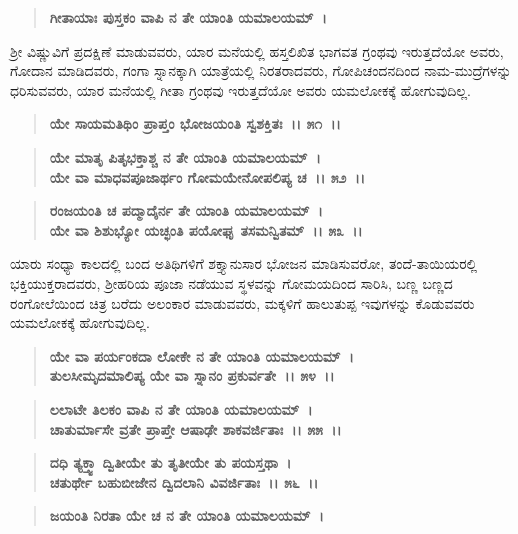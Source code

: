 \begin{verse}
\textbf{ಗೀತಾಯಾಃ ಪುಸ್ತಕಂ ವಾಪಿ ನ ತೇ ಯಾಂತಿ ಯಮಾಲಯಮ್~।}
\end{verse}

ಶ‍್ರೀ ವಿಷ್ಣುವಿಗೆ ಪ್ರದಕ್ಷಿಣೆ ಮಾಡುವವರು, ಯಾರ ಮನೆಯಲ್ಲಿ ಹಸ್ತಲಿಖಿತ ಭಾಗವತ ಗ್ರಂಥವು ಇರುತ್ತದೆಯೋ ಅವರು, ಗೋದಾನ ಮಾಡಿದವರು, ಗಂಗಾ ಸ್ನಾನಕ್ಕಾಗಿ ಯಾತ್ರೆಯಲ್ಲಿ ನಿರತರಾದವರು, ಗೋಪಿಚಂದನದಿಂದ ನಾಮ-ಮುದ್ರೆಗಳನ್ನು ಧರಿಸುವವರು, ಯಾರ ಮನೆಯಲ್ಲಿ ಗೀತಾ ಗ್ರಂಥವು ಇರುತ್ತದೆಯೋ ಅವರು ಯಮಲೋಕಕ್ಕೆ ಹೋಗುವುದಿಲ್ಲ.

\begin{verse}
\textbf{ಯೇ ಸಾಯಮತಿಥಿಂ ಪ್ರಾಪ್ತಂ ಭೋಜಯಂತಿ ಸ್ವಶಕ್ತಿತಃ~।। ೫೧~।।} 
\end{verse}

\begin{verse}
\textbf{ಯೇ ಮಾತೃ ಪಿತೃಭಕ್ತಾಶ್ಚ ನ ತೇ ಯಾಂತಿ ಯಮಾಲಯಮ್~।}\\\textbf{ಯೇ ವಾ ಮಾಧವಪೂಜಾರ್ಥಂ ಗೋಮಯೇನೋಪಲಿಪ್ಯ ಚ~।। ೫೨~।। }
\end{verse}

\begin{verse}
\textbf{ರಂಜಯಂತಿ ಚ ಪದ್ಮಾದೈರ್ನ ತೇ ಯಾಂತಿ ಯಮಾಲಯಮ್~।}\\\textbf{ಯೇ ವಾ ಶಿಶುಭ್ಯೋ ಯಚ್ಛಂತಿ ಪಯೋಘೃ ತಸಮನ್ವಿತಮ್~।। ೫೩~।।}
\end{verse}

ಯಾರು ಸಂಧ್ಯಾ ಕಾಲದಲ್ಲಿ ಬಂದ ಅತಿಥಿಗಳಿಗೆ ಶಕ್ತ್ಯಾನುಸಾರ ಭೋಜನ ಮಾಡಿಸುವರೋ, ತಂದೆ-ತಾಯಿಯರಲ್ಲಿ ಭಕ್ತಿಯುಕ್ತರಾದವರು, ಶ‍್ರೀಹರಿಯ ಪೂಜಾ ನಡೆಯುವ ಸ್ಥಳವನ್ನು ಗೋಮಯದಿಂದ ಸಾರಿಸಿ, ಬಣ್ಣ ಬಣ್ಣದ ರಂಗೋಲೆಯಿಂದ ಚಿತ್ರ ಬರೆದು ಅಲಂಕಾರ ಮಾಡುವವರು, ಮಕ್ಕಳಿಗೆ ಹಾಲುತುಪ್ಪ ಇವುಗಳನ್ನು ಕೊಡುವವರು ಯಮಲೋಕಕ್ಕೆ ಹೋಗುವುದಿಲ್ಲ.

\begin{verse}
\textbf{ಯೇ ವಾ ಪರ್ಯಂಕದಾ ಲೋಕೇ ನ ತೇ ಯಾಂತಿ ಯಮಾಲಯಮ್~।}\\\textbf{ತುಲಸೀಮೃದಮಾಲಿಪ್ಯ ಯೇ ವಾ ಸ್ನಾನಂ ಪ್ರಕುರ್ವತೇ~।। ೫೪~।। }
\end{verse}

\begin{verse}
\textbf{ಲಲಾಟೇ ತಿಲಕಂ ವಾಪಿ ನ ತೇ ಯಾಂತಿ ಯಮಾಲಯಮ್~।}\\\textbf{ಚಾತುರ್ಮಾಸೇ ವ್ರತೇ ಪ್ರಾಪ್ತೇ ಆಷಾಢೇ ಶಾಕವರ್ಜಿತಾಃ~।। ೫೫~।।} 
\end{verse}

\begin{verse}
\textbf{ದಧಿ ತ್ಯಕ್ತ್ವಾ ದ್ವಿತೀಯೇ ತು ತೃತೀಯೇ ತು ಪಯಸ್ತಥಾ~।}\\\textbf{ಚತುರ್ಥೇ ಬಹುಬೀಜೇನ ದ್ವಿದಲಾನಿ ವಿವರ್ಜಿತಾಃ~।। ೫೬~।। }
\end{verse}

\begin{verse}
\textbf{ಜಯಂತಿ ನಿರತಾ ಯೇ ಚ ನ ತೇ ಯಾಂತಿ ಯಮಾಲಯಮ್~।}
\end{verse}

